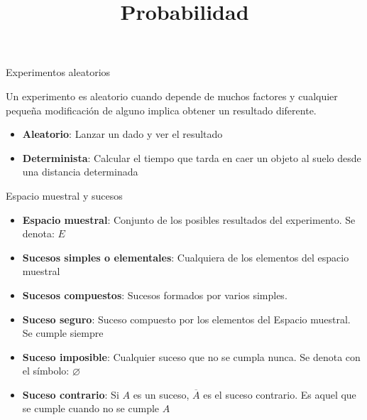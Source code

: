 \documentclass[11pt]{beamer}
\title{Probabilidad}
\date{}
\begin{document}
\begin{frame}
\titlepage
\end{frame}


\begin{frame}{Experimentos aleatorios}
\begin{block}{}
Un experimento es aleatorio cuando depende de muchos factores y cualquier pequeña modificación de alguno implica obtener un resultado diferente.
\end{block}
\begin{itemize}
 \item \textbf{Aleatorio}: Lanzar un dado y ver el resultado
 \item \textbf{Determinista}: Calcular el tiempo que tarda en caer un objeto al suelo desde una distancia determinada
 \end{itemize} 

\end{frame}



\begin{frame}{Espacio muestral y sucesos}
\begin{itemize}
\item \textbf{Espacio muestral}: Conjunto de los posibles resultados del experimento. Se denota: $E$
\item \textbf{Sucesos simples o elementales}: Cualquiera de los elementos del espacio muestral
\item \textbf{Sucesos compuestos}: Sucesos formados por varios simples. 
\item \textbf{Suceso seguro}: Suceso compuesto por los elementos del Espacio muestral. Se cumple siempre
\item \textbf{Suceso imposible}: Cualquier suceso que no se cumpla nunca. Se denota con el símbolo: $\varnothing$
\item \textbf{Suceso contrario}: Si $A$ es un suceso, $\overline{A}$ es el suceso contrario. Es aquel que se cumple cuando no se cumple $A$
\end{itemize}

\end{frame}
\end{document}
